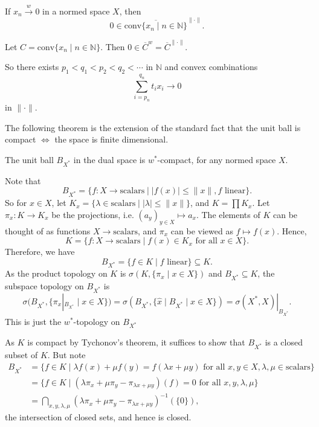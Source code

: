 \documentclass[12pt]{article}
\begin{document}
\begin{corollary}
	If $x_n \overset w\to 0$ in a normed space $X$, then
	\[
		0 \in \overline{\mathrm{conv}\{x_n \mid n \in \mathbb{N}\}}^{\|\cdot\|}.
	\]
\end{corollary}

\begin{proofbox}
	Let $C = \mathrm{conv}\{x_n \mid n \in \mathbb{N}\}$. Then $0 \in \overline{C}^w = \overline{C}^{\|\cdot\|}$.
\end{proofbox}

\begin{remark}
	So there exists $p_1 < q_1 < p_2 < q_2 < \cdots$ in $\mathbb{N}$ and convex combinations
	\[
	\sum_{i = p_n}^{q_n} t_i x_i \to 0
	\]
	in $\|\cdot\|$.
\end{remark}


The following theorem is the extension of the standard fact that the unit ball is compact $\iff$ the space is finite dimensional.

\begin{theorem}
	The unit ball $B_{X^{\ast}}$ in the dual space is $w^{\ast}$-compact, for any normed space $X$.
\end{theorem}

\begin{proofbox}
	Note that
	\[
		B_{X^{\ast}} = \{f : X \to \text{scalars} \mid |f(x)| \leq \|x\|, f \text{ linear}\}.
	\]
	So for $x \in X$, let $K_x = \{ \lambda \in \text{scalars} \mid |\lambda| \leq \|x\|\}$, and $K = \prod K_x$. Let $\pi_x : K \to K_x$ be the projections, i.e. $(a_y)_{y \in X} \mapsto a_x$. The elements of $K$ can be thought of as functions $X \to \text{scalars}$, and $\pi_x$ can be viewed as $f \mapsto f(x)$. Hence,
	\[
		K = \{f : X \to \text{scalars} \mid f(x) \in K_x \text{ for all } x \in X\}.
	\]
	Therefore, we have
	\[
		B_{X^{\ast}} = \{f \in K \mid f \text{ linear}\} \subseteq K.
	\]
	As the product topology on $K$ is $\sigma(K, \{\pi_x \mid x \in X\})$ and $B_{X^{\ast}} \subseteq K$, the subspace topology on $B_{X^{\ast}}$ is
	\[
		\sigma(B_{X^{\ast}}, \{\pi_x|_{B_{X^{\ast}}} \mid x \in X\}) = \sigma(B_{X^{\ast}}, \{\hat x \mid B_{X^{\ast}} \mid x \in X\}) = \sigma(X^{\ast}, X)|_{B_{X^{\ast}}}.
	\]
	This is just the $w^{\ast}$-topology on $B_{X^{\ast}}$ 

	As $K$ is compact by Tychonov's theorem, it suffices to show that $B_{X^{\ast}}$ is a closed subset of $K$. But note
	\begin{align*}
		B_{X^{\ast}} &= \{f \in K \mid \lambda f(x) + \mu f(y) = f(\lambda x + \mu y) \text{ for all } x, y \in X, \lambda, \mu \in \text{scalars}\} \\
			     &= \{ f \in K \mid (\lambda \pi_x + \mu \pi_y - \pi_{\lambda x + \mu y})(f) = 0 \text{ for all } x, y, \lambda, \mu\} \\
			     &= \bigcap_{x, y, \lambda, \mu} (\lambda \pi_x + \mu \pi_y - \pi_{\lambda x + \mu y})^{-1}(\{0\}),
	\end{align*}
	the intersection of closed sets, and hence is closed.
\end{proofbox}
\end{document}
